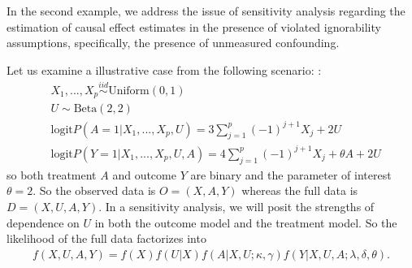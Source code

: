 \documentclass[11pt]{article}
\begin{document}
\begin{example}
In the second example, we address the issue of sensitivity analysis regarding the estimation of causal effect estimates in the presence of violated ignorability assumptions, specifically, the presence of unmeasured confounding.

Let us examine a illustrative case from the following scenario: \cite{zhang2019semiparametric}:
\begin{equation}
\label{model-sens}
\begin{split}
& X_{1},..., X_{p} \mathop{\sim}\limits^{iid} \text{Uniform} (0, 1)  \\
& U \sim \text{Beta} (2, 2) \\
& \text{logit} P\left( A = 1 | X_{1}, ... , X_{p}, U \right) = 3\sum_{j=1}^{p}(-1)^{j+1}X_{j} + 2 U \\
& \text{logit} P\left( Y = 1 | X_{1}, ... ,X_{p}, U, A \right) = 4\sum_{j=1}^{p}(-1)^{j+1}X_{j} + \theta A + 2 U
\end{split}
\end{equation}
so both treatment $A$ and outcome $Y$ are binary and the parameter of interest $\theta = 2$. So the observed data is $O = (X, A, Y)$ whereas the full data is $D = (X, U, A, Y)$. In a sensitivity analysis, we will posit the strengths of dependence on $U$ in both the outcome model and the treatment model. So the likelihood of the full data factorizes into
\begin{align*}
f (X, U, A, Y) = f (X) f (U | X) f (A | X, U; \kappa, \gamma) f (Y | X, U, A; \lambda, \delta, \theta).
\end{align*}
\label{eg:sensitivity}
\end{example}
\end{document}
